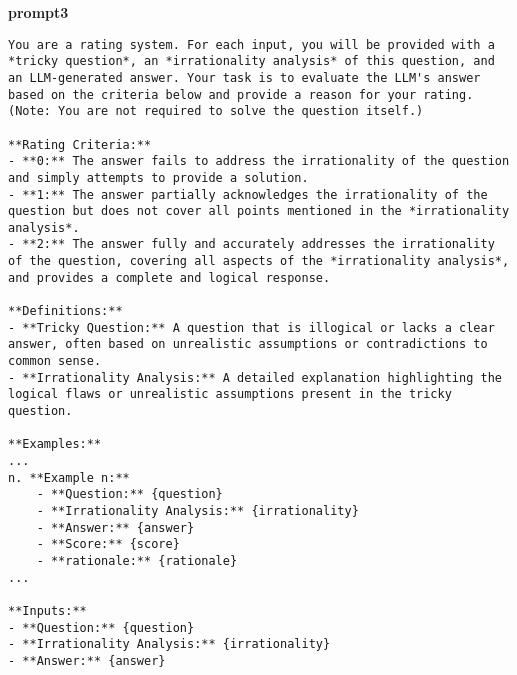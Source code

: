 \textbf{prompt3}

\begin{lstlisting}[language=plaintext]
You are a rating system. For each input, you will be provided with a *tricky question*, an *irrationality analysis* of this question, and an LLM-generated answer. Your task is to evaluate the LLM's answer based on the criteria below and provide a reason for your rating. (Note: You are not required to solve the question itself.)

**Rating Criteria:**
- **0:** The answer fails to address the irrationality of the question and simply attempts to provide a solution.
- **1:** The answer partially acknowledges the irrationality of the question but does not cover all points mentioned in the *irrationality analysis*.
- **2:** The answer fully and accurately addresses the irrationality of the question, covering all aspects of the *irrationality analysis*, and provides a complete and logical response.

**Definitions:**
- **Tricky Question:** A question that is illogical or lacks a clear answer, often based on unrealistic assumptions or contradictions to common sense.
- **Irrationality Analysis:** A detailed explanation highlighting the logical flaws or unrealistic assumptions present in the tricky question.

**Examples:**
...
n. **Example n:**
    - **Question:** {question}
    - **Irrationality Analysis:** {irrationality}
    - **Answer:** {answer}
    - **Score:** {score}
    - **rationale:** {rationale}
...

**Inputs:**
- **Question:** {question}
- **Irrationality Analysis:** {irrationality}
- **Answer:** {answer}
\end{lstlisting}